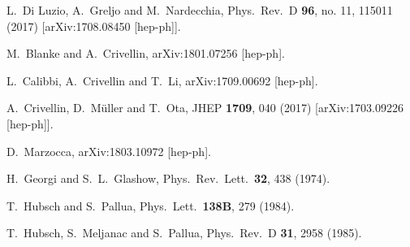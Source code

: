 \documentclass[aps,prd,superscriptaddress,twocolumn,secnumarabic]{revtex4-1}
\begin{document}
\begin{thebibliography}{99}
  L.~Di Luzio, A.~Greljo and M.~Nardecchia,
  Phys.\ Rev.\ D {\bf 96}, no. 11, 115011 (2017)
  [arXiv:1708.08450 [hep-ph]].


  M.~Blanke and A.~Crivellin,
  arXiv:1801.07256 [hep-ph].


  L.~Calibbi, A.~Crivellin and T.~Li,
  arXiv:1709.00692 [hep-ph].


  A.~Crivellin, D.~Müller and T.~Ota,
  JHEP {\bf 1709}, 040 (2017)
  [arXiv:1703.09226 [hep-ph]].


  D.~Marzocca,
  arXiv:1803.10972 [hep-ph].


  H.~Georgi and S.~L.~Glashow,
  Phys.\ Rev.\ Lett.\  {\bf 32}, 438 (1974).


  T.~Hubsch and S.~Pallua,
  Phys.\ Lett.\  {\bf 138B}, 279 (1984).


  T.~Hubsch, S.~Meljanac and S.~Pallua,
  Phys.\ Rev.\ D {\bf 31}, 2958 (1985).



\end{thebibliography}
\end{document}
